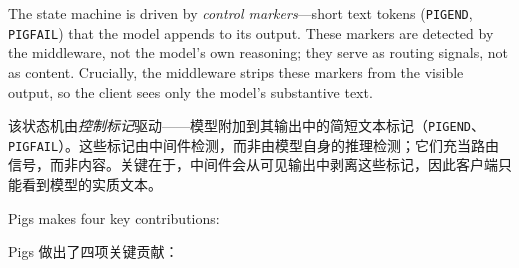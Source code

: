 The state machine is driven by \emph{control markers}---short text tokens (\texttt{PIGEND}, \texttt{PIGFAIL}) that the model appends to its output. These markers are detected by the middleware, not the model's own reasoning; they serve as routing signals, not as content. Crucially, the middleware strips these markers from the visible output, so the client sees only the model's substantive text.
\begin{chinese}
该状态机由\emph{控制标记}驱动——模型附加到其输出中的简短文本标记（\texttt{PIGEND}、\texttt{PIGFAIL}）。这些标记由中间件检测，而非由模型自身的推理检测；它们充当路由信号，而非内容。关键在于，中间件会从可见输出中剥离这些标记，因此客户端只能看到模型的实质文本。
\end{chinese}

Pigs makes four key contributions:
\begin{chinese}
Pigs 做出了四项关键贡献：
\end{chinese}

